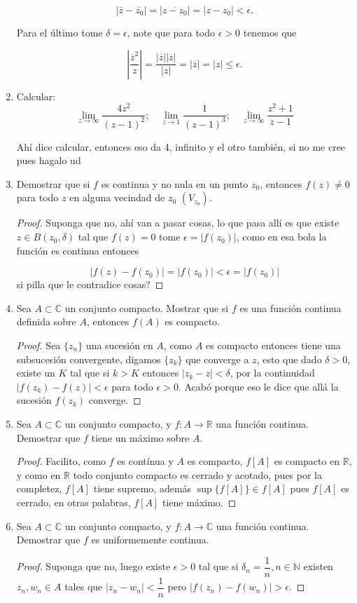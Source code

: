 \documentclass[11pt]{article}
\begin{document}
\begin{enumerate}
$$|\overline{z}-\overline{z_0}|=|\overline{z-z_0}|=|z-z_0|<\epsilon.$$

Para el último tome $\delta=\epsilon$, note que para todo $\epsilon>0$ tenemos que

$$\left|\frac{\overline{z}^2}{z} \right|=\frac{|\overline{z}||\overline{z}|}{|z|}=|\overline{z}|=|z|\leq\epsilon.$$

    \item Calcular:
    \[
    \lim_{z \to \infty} \frac{4z^2}{(z - 1)^2}; \quad \lim_{z \to 1} \frac{1}{(z - 1)^3}; \quad \lim_{z \to \infty} \frac{z^2 + 1}{z - 1}
    \]

    Ahí dice calcular, entonces eso da 4, infinito y el otro también, si no me cree pues hagalo ud

    \item Demostrar que si $f$ es continua y no nula en un punto $z_0$, entonces $f(z) \neq 0$ para todo $z$ en alguna vecindad de $z_0$ $(V_{z_0})$.

\begin{proof}
Suponga que no, ahí van a pasar cosas, lo que pasa allí es que existe $z\in B(z_0,\delta)$ tal que $f(z)=0$ tome $\epsilon=|f(z_0)|$, como en esa bola la función es continua entonces

$$|f(z)-f(z_0)|=|f(z_0)|<\epsilon=|f(z_0)|$$
si pilla que le contradice cosas?
\end{proof}

    \item Sea $A \subset \mathbb{C}$ un conjunto compacto. Mostrar que si $f$ es una función continua definida sobre $A$, entonces $f(A)$ es compacto.

\begin{proof}
Sea $\{z_n\}$ una sucesión en $A$, como $A$ es compacto entonces tiene una subsucesión convergente, digamos $\{z_{k}\}$ que converge a $z$, esto que dado $\delta>0$, existe un $K$ tal que si $k>K$ entonces $|z_{k}-z|<\delta$, por la continuidad $|f(z_k)-f(z)|<\epsilon$ para todo $\epsilon>0$. Acabó porque eso le dice que allá la sucesión $f(z_k)$ converge.
\end{proof}

    \item Sea $A \subset \mathbb{C}$ un conjunto compacto, y $f: A \to \mathbb{R}$ una función continua. Demostrar que $f$ tiene un máximo sobre $A$.
    \begin{proof}
    Facilito, como $f$ es contínua y $A$ es compacto, $f[A]$ es compacto en $\mathbb{R}$, y como en $\mathbb{R}$ todo conjunto compacto es cerrado y acotado, pues por la completez, $f[A]$ tiene supremo, además $\sup\{f[A]\}\in f[A]$ pues $f[A]$ es cerrado, en otras palabras, $f[A]$ tiene máximo.
    \end{proof}
    \item Sea $A \subset \mathbb{C}$ un conjunto compacto, y $f: A \to \mathbb{C}$ una función continua. Demostrar que $f$ es uniformemente continua.
    \begin{proof}
    Suponga que no, luego existe $\epsilon>0$ tal que si $\delta_n=\dfrac{1}{n}, n\in\mathbb{N}$ existen $z_n,w_n\in A$ tales que $|z_n-w_n|<\dfrac{1}{n}$  pero $|f(z_n)-f(w_n)|>\epsilon$.


\end{proof}
\end{enumerate}
\end{document}
